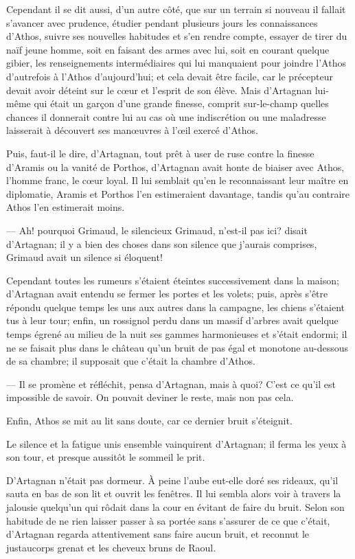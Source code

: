 Cependant il se dit aussi, d'un autre côté, que sur un terrain si nouveau il fallait s'avancer avec prudence, étudier pendant plusieurs jours les connaissances d'Athos, suivre ses nouvelles habitudes et s'en rendre compte, essayer de tirer du naïf jeune homme, soit en faisant des armes avec lui, soit en courant quelque gibier, les renseignements intermédiaires qui lui manquaient pour joindre l'Athos d'autrefois à l'Athos d'aujourd'hui; et cela devait être facile, car le précepteur devait avoir déteint sur le cœur et l'esprit de son élève. Mais d'Artagnan lui-même qui était un garçon d'une grande finesse, comprit sur-le-champ quelles chances il donnerait contre lui au cas où une indiscrétion ou une maladresse laisserait à découvert ses manœuvres à l'œil exercé d'Athos.

Puis, faut-il le dire, d'Artagnan, tout prêt à user de ruse contre la finesse d'Aramis ou la vanité de Porthos, d'Artagnan avait honte de biaiser avec Athos, l'homme franc, le cœur loyal. Il lui semblait qu'en le reconnaissant leur maître en diplomatie, Aramis et Porthos l'en estimeraient davantage, tandis qu'au contraire Athos l'en estimerait moins.

— Ah! pourquoi Grimaud, le silencieux Grimaud, n'est-il pas ici? disait d'Artagnan; il y a bien des choses dans son silence que j'aurais comprises, Grimaud avait un silence si éloquent!

Cependant toutes les rumeurs s'étaient éteintes successivement dans la maison; d'Artagnan avait entendu se fermer les portes et les volets; puis, après s'être répondu quelque temps les uns aux autres dans la campagne, les chiens s'étaient tus à leur tour; enfin, un rossignol perdu dans un massif d'arbres avait quelque temps égrené au milieu de la nuit ses gammes harmonieuses et s'était endormi; il ne se faisait plus dans le château qu'un bruit de pas égal et monotone au-dessous de sa chambre; il supposait que c'était la chambre d'Athos.

— Il se promène et réfléchit, pensa d'Artagnan, mais à quoi? C'est ce qu'il est impossible de savoir. On pouvait deviner le reste, mais non pas cela.

Enfin, Athos se mit au lit sans doute, car ce dernier bruit s'éteignit.

Le silence et la fatigue unis ensemble vainquirent d'Artagnan; il ferma les yeux à son tour, et presque aussitôt le sommeil le prit.

D'Artagnan n'était pas dormeur. À peine l'aube eut-elle doré ses rideaux, qu'il sauta en bas de son lit et ouvrit les fenêtres. Il lui sembla alors voir à travers la jalousie quelqu'un qui rôdait dans la cour en évitant de faire du bruit. Selon son habitude de ne rien laisser passer à sa portée sans s'assurer de ce que c'était, d'Artagnan regarda attentivement sans faire aucun bruit, et reconnut le justaucorps grenat et les cheveux bruns de Raoul.

